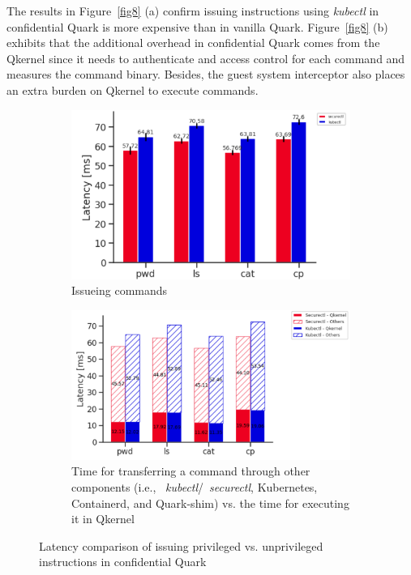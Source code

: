 The results in Figure~\ref{fig8} (a) confirm issuing instructions using \emph{kubectl} in confidential Quark is more expensive than in vanilla Quark. Figure~\ref{fig8} (b) exhibits that the additional overhead in confidential Quark comes from the Qkernel 
since it needs to authenticate and access control for each command and measures the command binary. Besides, the guest system interceptor also places an extra burden on Qkernel to execute commands.



\begin{figure}[!htb] 
    \begin{subfigure}[b]{0.5\linewidth}
      \centering
      \centering
      \includegraphics[width=1\textwidth]{images/speed_of_issuing_cmd_in_cquark_kubctl_securectl.png} %
      \caption{Issueing commands}
      \label{fig:speed_of_issuing_cmd_in_cquark_kubctl_securectl}
      \vspace{4ex}
    \end{subfigure}%
    \begin{subfigure}[b]{0.5\linewidth}
      \centering
      \includegraphics[width=1\textwidth]{images/timeshare_issuing_cmd_in_cquark_kubectl_securectl.png} %
      \caption{Time for transferring a command through other components (i.e., ~\emph{kubectl}/~\emph{securectl},  Kubernetes, Containerd, and Quark-shim) vs. the time for executing it in Qkernel}
      \label{fig:timeshare_issuing_cmd_in_cquark_kubectl_securectl}
      \vspace{4ex}
    \end{subfigure} 
    \caption{Latency comparison of issuing privileged vs. unprivileged instructions in confidential Quark}
    \label{fig9} 
\end{figure}



